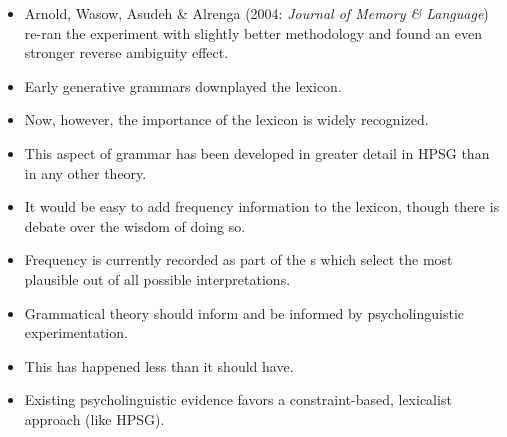 \documentclass[a4paper,landscape,headrule,footrule,dvips]{foils}
\begin{document}

\begin{center}
  \begin{bchart}[max=100,step=25,unit=\%,scale=2.2]
    \smallskip
  \end{bchart}
\end{center}

\begin{itemize}
\item Arnold, Wasow, Asudeh \& Alrenga (2004:
\textit{Journal of Memory \& Language})
re-ran the experiment with slightly better 
methodology and found an even stronger reverse 
ambiguity effect.
\end{itemize}



\begin{itemize}
\item Early generative grammars downplayed the lexicon.
\item Now, however, the importance of the lexicon is widely 
recognized.
\item This aspect of grammar has been developed in greater 
detail in HPSG than in any other theory.
\item It would be easy to add frequency information to the
lexicon, though there is debate over the wisdom of 
doing so.
\item Frequency is currently recorded as part of the s which select the most plausible out of all
  possible interpretations.
\end{itemize}



\begin{itemize}
\item Grammatical theory should inform and be informed 
by psycholinguistic experimentation.
\item This has happened less than it should have.
\item Existing psycholinguistic evidence favors a 
constraint-based, lexicalist approach (like HPSG).
\end{itemize}
\end{document}
